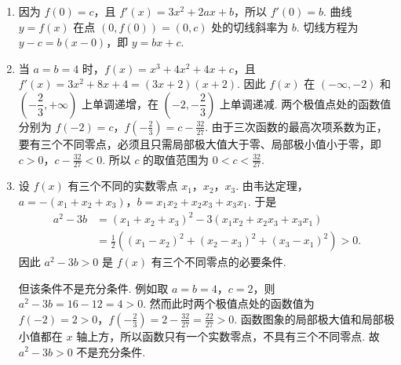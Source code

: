 \begin{solution}
\begin{enumerate}
\item 因为 \(f(0)=c\)，且 \(f'(x)=3x^2+2ax+b\)，所以 \(f'(0)=b\). 曲线 \(y=f(x)\) 在点 \((0,f(0))=(0,c)\) 处的切线斜率为 \(b\). 切线方程为 \(y-c=b(x-0)\)，即 \(y=bx+c\).

\item 当 \(a=b=4\) 时，\(f(x)=x^3+4x^2+4x+c\)，且 \(f'(x)=3x^2+8x+4=(3x+2)(x+2)\).
因此 \(f(x)\) 在 \(\left(-\infty,-2\right)\) 和 \(\left(-\dfrac23,+\infty\right)\) 上单调递增，在 \(\left(-2,-\dfrac23\right)\) 上单调递减. 两个极值点处的函数值分别为 \(f(-2)=c\)，\(f\left(-\frac23\right)=c-\frac{32}{27}\).
由于三次函数的最高次项系数为正，要有三个不同零点，必须且只需局部极大值大于零、局部极小值小于零，即 \(c>0\)，\(c-\frac{32}{27}<0\). 所以 \(c\) 的取值范围为 \(0<c<\frac{32}{27}\).

\item 设 \(f(x)\) 有三个不同的实数零点 \(x_1\)，\(x_2\)，\(x_3\). 由韦达定理，\(a=-(x_1+x_2+x_3)\)，\(b=x_1x_2+x_2x_3+x_3x_1\).
于是
\[
\begin{aligned}
a^2-3b
&=(x_1+x_2+x_3)^2-3(x_1x_2+x_2x_3+x_3x_1)\\
&=\frac12\left((x_1-x_2)^2+(x_2-x_3)^2+(x_3-x_1)^2\right)>0.
\end{aligned}
\]
因此 \(a^2-3b>0\) 是 \(f(x)\) 有三个不同零点的必要条件.

但该条件不是充分条件. 例如取 \(a=b=4\)，\(c=2\)，则 \(a^2-3b=16-12=4>0\).
然而此时两个极值点处的函数值为 \(f(-2)=2>0\)，\(f\left(-\frac23\right)=2-\frac{32}{27}=\frac{22}{27}>0\).
函数图象的局部极大值和局部极小值都在 \(x\) 轴上方，所以函数只有一个实数零点，不具有三个不同零点. 故 \(a^2-3b>0\) 不是充分条件.
\end{enumerate}
\end{solution}
